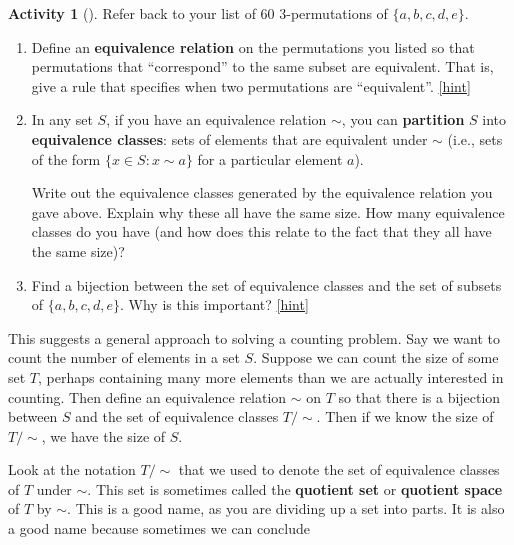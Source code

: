 \documentclass[10pt,]{book}
\newcommand{\terminology}[1]{\textbf{#1}}
\theoremstyle{plain}
\theoremstyle{definition}
\theoremstyle{definition}
\theoremstyle{definition}
\newtheorem{activity}[project]{Activity}
\numberwithin{equation}{chapter}
\def\st{:}
\begin{document}
\begin{activity}[]\label{activity-102}
\hypertarget{p-749}{}%
Refer back to your list of 60 3-permutations of \(\{a,b,c,d,e\}\).%
\begin{enumerate}[font=\bfseries,label=(\alph*),ref=\alph*]
\item\label{task-142} \hypertarget{p-750}{}%
Define an \terminology{equivalence relation} on the permutations you listed so that permutations that ``correspond'' to the same subset are equivalent.  That is, give a rule that specifies when two permutations are ``equivalent''.%
\hfill{\tiny\hyperlink{a-109.a}{[hint]}\hypertarget{q-109.a}{}}\item\label{task-143} \hypertarget{p-752}{}%
In any set \(S\), if you have an equivalence relation \(\sim\), you can \terminology{partition} \(S\) into \terminology{equivalence classes}: sets of elements that are equivalent under \(\sim\) (i.e., sets of the form \(\{x \in S \st x \sim a\} \) for a particular element \(a\)).%
\par
\hypertarget{p-753}{}%
Write out the equivalence classes generated by the equivalence relation you gave above.  Explain why these all have the same size.  How many equivalence classes do you have (and how does this relate to the fact that they all have the same size)?%
\item\label{task-144} \hypertarget{p-754}{}%
Find a bijection between the set of equivalence classes and the set of subsets of \(\{a,b,c,d,e\}\).  Why is this important?%
\hfill{\tiny\hyperlink{a-109.c}{[hint]}\hypertarget{q-109.c}{}}\end{enumerate}
\end{activity}
\hypertarget{p-756}{}%
This suggests a general approach to solving a counting problem.  Say we want to count the number of elements in a set \(S\).  Suppose we can count the size of some set \(T\), perhaps containing many more elements than we are actually interested in counting.  Then define an equivalence relation \(\sim\) on \(T\) so that there is a bijection between \(S\) and the set of equivalence classes \(T/\sim\).  Then if we know the size of \(T/\sim\), we have the size of \(S\).%
\par
\hypertarget{p-757}{}%
Look at the notation \(T/\sim\) that we used to denote the set of equivalence classes of \(T\) under \(\sim\).  This set is sometimes called the \terminology{quotient set} or \terminology{quotient space} of \(T\) by \(\sim\).  This is a good name, as you are dividing up a set into parts.  It is also a good name because sometimes we can conclude%
\end{document}
